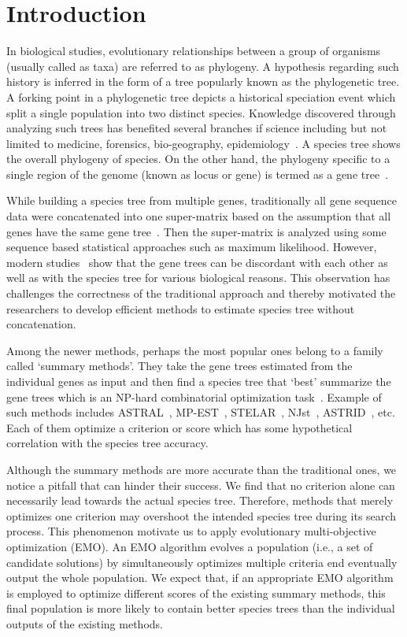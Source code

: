 \section{Introduction}
\label{sec:intro}
In biological studies, evolutionary relationships between a group of organisms (usually called as taxa) are referred to as phylogeny. A hypothesis regarding such history is inferred in the form of a tree popularly known as the phylogenetic tree. A forking point in a phylogenetic tree depicts a historical speciation event which split a single population into two distinct species.  Knowledge discovered through analyzing such trees has benefited several branches if science including but not limited to medicine, forensics, bio-geography, epidemiology~\cite{felix2015phylogenetics}. A species tree shows the overall phylogeny of species. On the other hand, the phylogeny specific to a single region of the genome (known as locus or gene) is termed as a gene tree~\cite{maddison1997gene}. 

While building a species tree from multiple genes, traditionally all gene sequence data were concatenated into one super-matrix based on the assumption that all genes have the same gene tree~\cite{huelsenbeck1996combining, de2007supermatrix}. Then the super-matrix is analyzed using some sequence based statistical approaches such as maximum likelihood. However, modern studies~\cite{zwickl2014disentangling, jarvis2014whole} show that the gene trees can be discordant with each other as well as with the species tree for various biological reasons. This observation has challenges the correctness of the traditional approach and thereby motivated the researchers to develop efficient methods to estimate species tree without concatenation. 

Among the newer methods, perhaps the most popular ones belong to a family called `summary methods'. They take the gene trees estimated from the individual genes as input and then find a species tree that `best' summarize the gene trees which is an NP-hard combinatorial optimization task~\cite{mirarab2014astral}. Example of such methods includes ASTRAL~\cite{mirarab2014astral}, MP-EST~\cite{liu2010maximum}, STELAR~\cite{islam2019stelar}, NJst~\cite{liu2011estimating}, ASTRID~\cite{vachaspati2015astrid}, etc. Each of them optimize a criterion or score which has some hypothetical correlation with the species tree accuracy. 

Although the summary methods are more accurate than the traditional ones, we notice a pitfall that can hinder their success. We find that no criterion alone can necessarily lead towards the actual species tree. Therefore, methods that merely optimizes one criterion may overshoot the intended species tree during its search process. This phenomenon motivate us to apply evolutionary multi-objective optimization (EMO). An EMO algorithm evolves a population (i.e., a set of candidate solutions) by simultaneously optimizes multiple criteria end eventually output the whole population. We expect that, if an appropriate EMO algorithm is employed to optimize different scores of the existing summary methods, this final population is more likely to contain better species trees than the individual outputs of the existing methods. 

